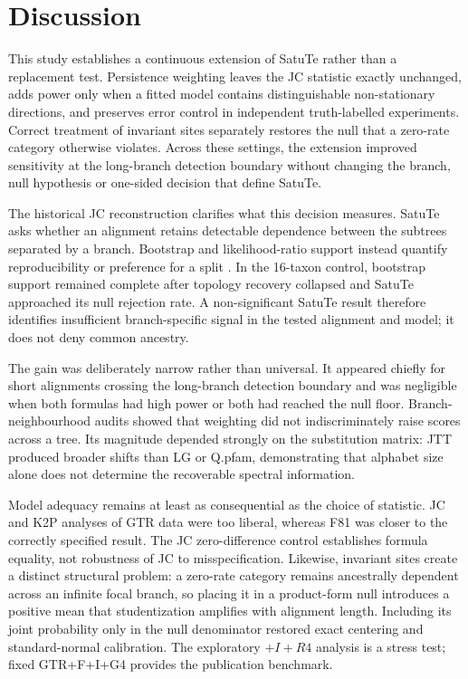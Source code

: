 \section*{Discussion}

This study establishes a continuous extension of SatuTe rather than a replacement test. Persistence weighting leaves the JC statistic exactly unchanged, adds power only when a fitted model contains distinguishable non-stationary directions, and preserves error control in independent truth-labelled experiments. Correct treatment of invariant sites separately restores the null that a zero-rate category otherwise violates. Across these settings, the extension improved sensitivity at the long-branch detection boundary without changing the branch, null hypothesis or one-sided decision that define SatuTe.

The historical JC reconstruction clarifies what this decision measures. SatuTe asks whether an alignment retains detectable dependence between the subtrees separated by a branch. Bootstrap and likelihood-ratio support instead quantify reproducibility or preference for a split \cite{felsenstein1985confidence,hoang2017,lemoine2018}. In the 16-taxon control, bootstrap support remained complete after topology recovery collapsed and SatuTe approached its null rejection rate. A non-significant SatuTe result therefore identifies insufficient branch-specific signal in the tested alignment and model; it does not deny common ancestry.

The gain was deliberately narrow rather than universal. It appeared chiefly for short alignments crossing the long-branch detection boundary and was negligible when both formulas had high power or both had reached the null floor. Branch-neighbourhood audits showed that weighting did not indiscriminately raise scores across a tree. Its magnitude depended strongly on the substitution matrix: JTT produced broader shifts than LG or Q.pfam, demonstrating that alphabet size alone does not determine the recoverable spectral information.

Model adequacy remains at least as consequential as the choice of statistic. JC and K2P analyses of GTR data were too liberal, whereas F81 was closer to the correctly specified result. The JC zero-difference control establishes formula equality, not robustness of JC to misspecification. Likewise, invariant sites create a distinct structural problem: a zero-rate category remains ancestrally dependent across an infinite focal branch, so placing it in a product-form null introduces a positive mean that studentization amplifies with alignment length. Including its joint probability only in the null denominator restored exact centering and standard-normal calibration. The exploratory \(+I+R4\) analysis is a stress test; fixed GTR+F+I+G4 provides the publication benchmark.

